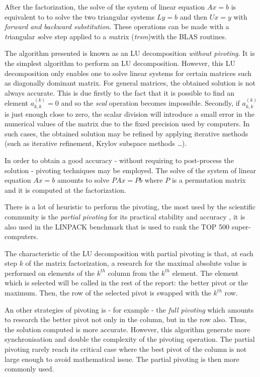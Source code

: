 After the factorization, the solve of the system of linear equation $Ax=b$ is equivalent to to solve the two triangular systems $Ly=b$ and then $Ux=y$ with \emph{forward and backward substitution}. These operations can be made with a \emph{tr}iangular \emph{s}olve step applied to a \emph{m}atrix (\emph{trsm})with the BLAS routines.

The algorithm presented is known as an LU decomposition \emph{without pivoting}. It is the simplest algorithm to perform an LU decomposition. However, this LU decomposition only enables one to solve linear systems for certain matrices such as diagonally dominant matrix. For general matrices, the obtained solution is not always accurate. This is due firstly to the fact that it is possible to find an element $a_{k,k}^{(k)} = 0$ and so the \emph{scal} operation becomes impossible. Secondly, if $a_{k,k}^{(k)}$ is just enough close to zero, the scalar division will introduce a small error in the numerical values of the matrix due to the fixed precision used by computers. In such cases, the obtained solution may be refined by applying iterative methods (such as iterative refinement, Krylov subspace methods \dots).

In order to obtain a good accuracy - without requiring to post-process the solution - pivoting techniques may be employed. The solve of the system of linear equation $Ax=b$ amounts to solve $PAx=Pb$ where $P$ is a permutation matrix and it is computed at the factorization.

There is a lot of heuristic to perform the pivoting, the most used by the scientific community is the \emph{partial pivoting} for its practical stability and accuracy \cite{Hig02}, it is also used in the LINPACK benchmark that is used to rank the TOP 500 super-computers.

The characteristic of the LU decomposition with partial pivoting is that, at each step $k$ of the matrix factorization, a research for the maximal absolute value is performed on elements of the $k^{th}$ column from the $k^{th}$ element. The element which is selected will be called in the rest of the report: the better pivot or the maximum. Then, the row of the selected pivot is swapped with the $k^{th}$ row.

An other strategies of pivoting is - for example - the \emph{full pivoting} which amounts to research the better pivot not only in the column, but in the row also. Thus, the solution computed is more accurate. However, this algorithm generate more synchronisation and double the complexity of the pivoting operation. The partial pivoting rarely reach its critical case where the best pivot of the column is not large enough to avoid mathematical issue. The partial pivoting is then more commonly used.

